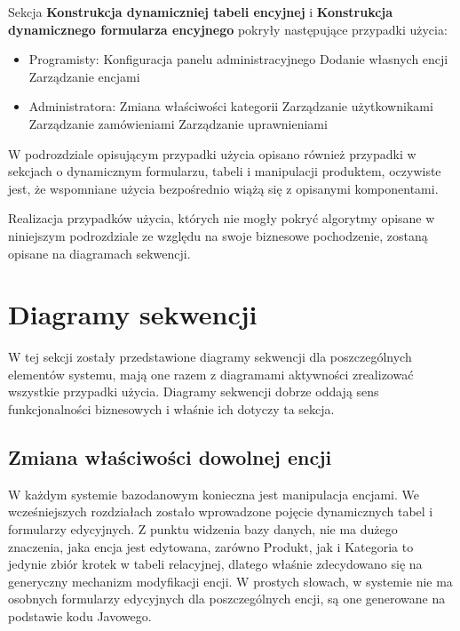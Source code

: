 Sekcja \textbf{Konstrukcja dynamiczniej tabeli encyjnej} i \textbf{Konstrukcja dynamicznego formularza encyjnego} pokryły następujące przypadki użycia:
\begin{itemize}
	\item Programisty: 
	\subitem Konfiguracja panelu administracyjnego
	\subitem Dodanie własnych encji
	\subitem Zarządzanie encjami
	\item Administratora:
	\subitem Zmiana właściwości kategorii
	\subitem Zarządzanie użytkownikami 
	\subitem Zarządzanie zamówieniami
	\subitem Zarządzanie uprawnieniami
\end{itemize}

W podrozdziale opisującym przypadki użycia opisano również przypadki w sekcjach o dynamicznym formularzu, tabeli i manipulacji produktem, oczywiste jest, że wspomniane użycia bezpośrednio wiążą się z opisanymi komponentami.

Realizacja przypadków użycia, których nie mogły pokryć algorytmy opisane w niniejszym podrozdziale ze względu na swoje biznesowe pochodzenie, zostaną opisane na diagramach sekwencji. 
\newpage
\section{Diagramy sekwencji}

W tej sekcji zostały przedstawione diagramy sekwencji dla poszczególnych elementów systemu, mają one razem z diagramami aktywności zrealizować wszystkie przypadki użycia. Diagramy sekwencji dobrze oddają sens funkcjonalności biznesowych i właśnie ich dotyczy ta sekcja. 

\subsection{Zmiana właściwości dowolnej encji}
W każdym systemie bazodanowym konieczna jest manipulacja encjami. We wcześniejszych rozdziałach zostało wprowadzone pojęcie dynamicznych tabel i formularzy edycyjnych. Z punktu widzenia bazy danych, nie ma dużego znaczenia, jaka encja jest edytowana, zarówno Produkt, jak i Kategoria to jedynie zbiór krotek w tabeli relacyjnej, dlatego właśnie zdecydowano się na generyczny mechanizm modyfikacji encji. W prostych słowach, w systemie nie ma osobnych formularzy edycyjnych dla poszczególnych encji, są one generowane na podstawie kodu Javowego. 

